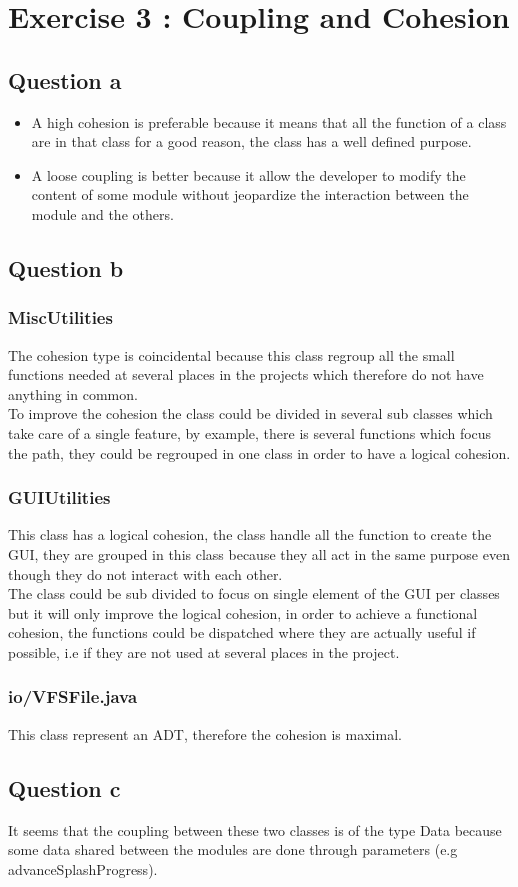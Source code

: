 \documentclass[a4paper,10pt]{article}
\begin{document}
\section{Exercise 3 : Coupling and Cohesion}
\subsection{Question a}
\begin{itemize}
\item A high cohesion is preferable because it means that all the function of a class are in that class for a good reason, the class has a well defined purpose.
\item A loose coupling is better because it allow the developer to modify the content of some module without jeopardize the interaction between the module and the others.
\end{itemize}
\subsection{Question b}
\subsubsection{MiscUtilities}
The cohesion type is coincidental because this class regroup all the small functions needed at several places in the projects which therefore do not have anything in common.\\
To improve the cohesion the class could be divided in several sub classes which take care of a single feature, by example, there is several functions which focus the path, they could be regrouped in one class in order to have a logical cohesion.
\subsubsection{GUIUtilities}
This class has a logical cohesion, the class handle all the function to create the GUI, they are grouped in this class because they all act in the same purpose even though they do not interact with each other.\\
The class could be sub divided to focus on single element of the GUI per classes but it will only improve the logical cohesion, in order to achieve a functional cohesion, the functions could be dispatched where they are actually useful if possible, i.e if they are not used at several places in the project.
\subsubsection{io/VFSFile.java}
This class represent an ADT, therefore the cohesion is maximal.
\subsection{Question c}
It seems that the coupling between these two classes is of the type Data because some data shared between the modules are done through parameters (e.g advanceSplashProgress).
\end{document}
